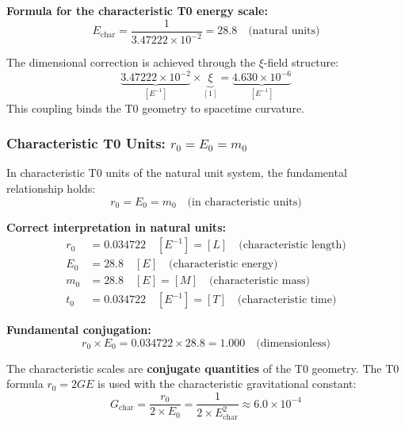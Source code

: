 	\textbf{Formula for the characteristic T0 energy scale:}
	\begin{equation}
		\boxed{E_{\text{char}} = \frac{1}{3.47222 \times 10^{-2}} = 28.8 \quad \text{(natural units)}}
	\end{equation}
	
	The dimensional correction is achieved through the $\xi$-field structure:
	\begin{equation}
		\underbrace{3.47222 \times 10^{-2}}_{[E^{-1}]} \times \underbrace{\xi}_{[1]} = \underbrace{4.630 \times 10^{-6}}_{[E^{-1}]}
	\end{equation}
	This coupling binds the T0 geometry to spacetime curvature.
	
	\subsubsection{Characteristic T0 Units: $r_0 = E_0 = m_0$}
	
	In characteristic T0 units of the natural unit system, the fundamental relationship holds:
	\begin{equation}
		r_0 = E_0 = m_0 \quad \text{(in characteristic units)}
	\end{equation}
	
	\textbf{Correct interpretation in natural units:}
	\begin{align}
		r_0 &= 0.034722 \quad [E^{-1}] = [L] \quad \text{(characteristic length)} \\
		E_0 &= 28.8 \quad [E] \quad \text{(characteristic energy)} \\
		m_0 &= 28.8 \quad [E] = [M] \quad \text{(characteristic mass)} \\
		t_0 &= 0.034722 \quad [E^{-1}] = [T] \quad \text{(characteristic time)}
	\end{align}
	
	\textbf{Fundamental conjugation:}
	\begin{equation}
		r_0 \times E_0 = 0.034722 \times 28.8 = 1.000 \quad \text{(dimensionless)}
	\end{equation}
	
	The characteristic scales are \textbf{conjugate quantities} of the T0 geometry. The T0 formula $r_0 = 2GE$ is used with the characteristic gravitational constant:
	\begin{equation}
		G_{\text{char}} = \frac{r_0}{2 \times E_0} = \frac{1}{2 \times E_{\text{char}}^2} \approx 6.0 \times 10^{-4}
	\end{equation}
	
